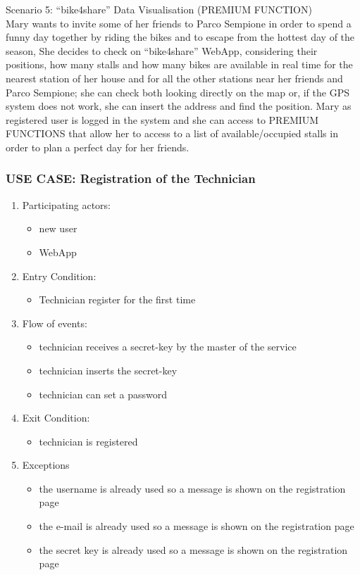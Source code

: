 \documentclass{article}
\begin{document}
Scenario 5: “bike4share” Data Visualisation (PREMIUM FUNCTION) \\
Mary wants to invite some of her friends to Parco Sempione in order to spend a funny day together by riding the bikes and to escape from the hottest day of the season, 
She decides to check on “bike4share” WebApp, considering their positions, how many stalls and how many bikes are available in real time for the nearest station of her house and for all the other stations near her friends and Parco Sempione; she can check both looking directly on the map or, if the GPS system does not work, she can insert the address and find the position.
Mary as registered user is logged in the system and she can access to PREMIUM FUNCTIONS that allow her to access to a list of available/occupied stalls  in order to plan a perfect day for her friends.

\subsubsection{\textbf{USE CASE}: Registration of the Technician}
\begin{enumerate}
\item Participating actors: 
\begin{itemize}
    \item new user
    \item WebApp
\end{itemize}
\item Entry Condition: 
\begin{itemize}
    \item Technician register for the first time
\end{itemize}
\item Flow of events: 
\begin{itemize}
    \item technician receives a secret-key by the master of the service
    \item technician inserts the secret-key
    \item technician can set a password
\end{itemize}
\item Exit Condition: 
\begin{itemize}
    \item technician is registered 
\end{itemize}
\item Exceptions
\begin{itemize}
    \item the username is already used so a message is shown on the registration page
    \item the e-mail is already used so a message is shown on the registration page
    \item the secret key is already used so a message is shown on the registration page
\end{itemize}
\end{enumerate}
\end{document}
